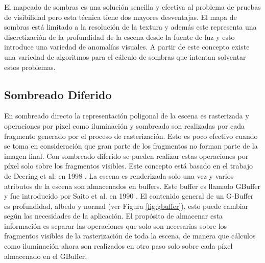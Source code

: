 El mapeado de sombras es una solución sencilla y efectiva al problema de pruebas de visibilidad pero esta técnica tiene dos mayores desventajas. El mapa de sombras está limitado a la resolución de la textura y además este representa una discretización de la profundidad de la escena desde la fuente de luz y esto introduce una variedad de anomalías visuales. A partir de este concepto existe una variedad de algoritmos para el cálculo de sombras que intentan solventar estos problemas.

\subsection{Sombreado Diferido}
\label{sub:deferred_rendering_theory}
En sombreado directo la representación poligonal de la escena es rasterizada y operaciones por píxel como iluminación y sombreado son realizadas por cada fragmento generado por el proceso de rasterización. Esto es poco efectivo cuando se toma en consideración que gran parte de los fragmentos no forman parte de la imagen final.
Con sombreado diferido se pueden realizar estas operaciones por píxel solo sobre los fragmentos visibles. Este concepto está basado en el trabajo de Deering et al. en 1998 \cite{Deering:1988}. La escena es renderizada solo una vez y varios atributos de la escena son almacenados en buffers. Este buffer es llamado \ac{GBuffer} y fue introducido por Saito et al. en 1990 \cite{Saito:1990}. El contenido general de un G-Buffer es profundidad, albedo y normal (ver Figura \ref{fig:gbuffer}), esto puede cambiar según las necesidades de la aplicación. El propósito de almacenar esta información es separar las operaciones que solo son necesarias sobre los fragmentos visibles de la rasterización de toda la escena, de manera que cálculos como iluminación ahora son realizados en otro paso solo sobre cada píxel almacenado en el \ac{GBuffer}.

